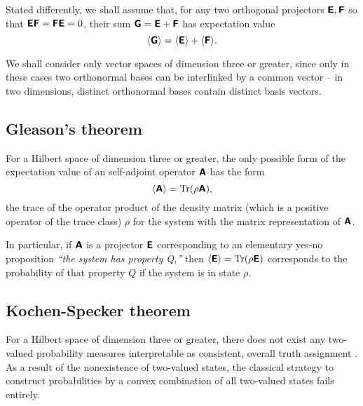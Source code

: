 Stated differently, we shall assume that,
for any two orthogonal projectors $ \textsf{\textbf{E}},\textsf{\textbf{F}}$
so that
 $ \textsf{\textbf{E}}\textsf{\textbf{F}}= \textsf{\textbf{F}}\textsf{\textbf{E}}=0$,
their sum
 $  \textsf{\textbf{G}} =\textsf{\textbf{E}}+\textsf{\textbf{F}}$
has expectation value
\begin{equation}
\langle \textsf{\textbf{G}}\rangle =
\langle \textsf{\textbf{E}} \rangle +
\langle \textsf{\textbf{F}} \rangle.
\end{equation}

We shall consider only vector spaces of dimension three or greater, since only in these cases two  orthonormal bases can be interlinked by a common vector -- in two dimensions,
distinct orthonormal bases contain distinct basis vectors.

\subsection{Gleason's theorem}

For a Hilbert space of dimension three or greater,
the only possible form of the  expectation value
of an self-adjoint operator  $\textsf{\textbf{A}}$
has the form
\cite{Gleason,r:dvur-93,pitowsky:218,rich-bridge,peres,hamhalter-book}
\begin{equation}
\langle
\textsf{\textbf{A}}
\rangle
=
\textrm{Tr}({  \rho} \textsf{\textbf{A}}),
\end{equation}
the trace of the operator product of the  density matrix (which is a positive operator of the trace class)
${  \rho}$
for the system with the matrix representation of $\textsf{\textbf{A}}$.

In particular, if $\textsf{\textbf{A}}$ is a projector $\textsf{\textbf{E}}$ corresponding to an elementary yes-no proposition
{\it ``the system has property Q,''} then $\langle \textsf{\textbf{E}}\rangle = \textrm{Tr}({  \rho}  \textsf{\textbf{E}})$ corresponds
to the probability of that property $Q$ if the system is in state ${  \rho}$.




\subsection{Kochen-Specker theorem}
\label{2011-m-KST}

For a Hilbert space of dimension three or greater,
there does not exist any
two-valued probability measures interpretable as consistent, overall truth assignment
\cite{specker-60,kochen1}.
As a result of the nonexistence of two-valued states, the classical strategy
to construct probabilities by a convex combination of all two-valued states fails entirely.

